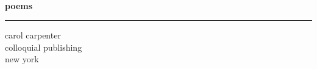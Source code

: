 \documentclass[openleft,10pt]{article}
\begin{document}
%
\hspace*{-0.125in}
%
\begin{minipage}[t][9.861in][t]{0.944in}
   \vspace*{-3in}
   \hspace*{0.25in}%
\end{minipage}%
%   
\begin{minipage}[t][9.861in][t]{6.625in}
  \noindent
  \vspace*{-2.75in} \mbox{ }
  \\
  \hspace*{1.625in} {\fontsize{86}{52}\sffamily\bfseries poems} \qquad
  \\[-4pt]
  \hspace*{1in}\rule{4.375in}{1.5pt}%
  \vspace*{2pt}
  \hspace*{3.115in} {\fontsize{24}{52}\sffamily carol carpenter} \qquad
  \\[5.5in]
  \hspace*{3.625in} {\sffamily\large colloquial publishing} \qquad
  \\
  \hspace*{4.585in} {\sffamily new york} \qquad
\end{minipage}
\vspace*{-8in}
\hspace*{-20in}
\end{document}
